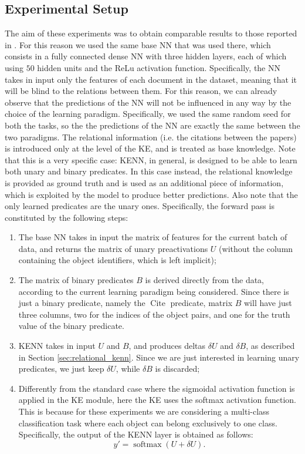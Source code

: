 \subsection{Experimental Setup}
The aim of these experiments was to obtain comparable results to those reported in \cite{marra2020relational}. For this reason we used the same base NN that was used there, which consists in a fully connected dense NN with three hidden layers, each of which using $50$ hidden units and the ReLu activation function. Specifically, the NN takes in input only the features of each document in the dataset, meaning that it will be blind to the relations between them. For this reason, we can already observe that the predictions of the NN will not be influenced in any way by the choice of the learning paradigm. Specifically, we used the same random seed for both the tasks, so the the predictions of the NN are exactly the same between the two paradigms.
The relational information (i.e. the citations between the papers) is introduced only at the level of the KE, and is treated as base knowledge. Note that this is a very specific case: KENN, in general, is designed to be able to learn both unary and binary predicates. \textcolor{unipd}{In this case instead, the relational knowledge is provided as ground truth and is used as an additional piece of information, which is exploited by the model to produce better predictions. Also note that the only learned predicates are the unary ones.} Specifically, the forward pass is constituted by the following steps:
\begin{enumerate}
	\item The base NN takes in input the matrix of features for the current batch of data, and returns the matrix of unary preactivations $U$ (without the column containing the object identifiers, which is left implicit);
	\item The matrix of binary predicates $B$ is derived directly from the data, according to the current learning paradigm being considered. Since there is just a binary predicate, namely the $\operatorname{Cite}$ predicate, matrix $B$ will have just three columns, two for the indices of the object pairs, and one for the truth value of the binary predicate. 
	\item KENN takes in input $U$ and $B$, and produces deltas $\delta U$ and $\delta B$, as described in Section \ref{sec:relational_kenn}. Since we are just interested in learning unary predicates, we just keep $\delta U$, while $\delta B$ is discarded;
	\item Differently from the standard case where the sigmoidal activation function is applied in the KE module, here the KE uses the softmax activation function. This is because for these experiments we are considering a multi-class classification task where each object can belong exclusively to one class. Specifically, the output of the KENN layer is obtained as follows:
	\begin{equation*}
	y'= \operatorname{softmax}(U + \delta U).
	\end{equation*}
	
\end{enumerate}

